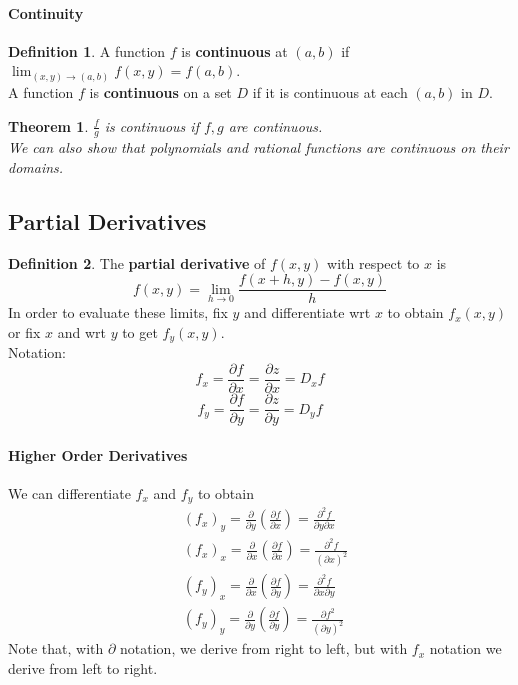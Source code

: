 \documentclass[12 pt]{article}
\newtheorem{thm}{Theorem}
\theoremstyle{definition}
\newtheorem{defn}{Definition}
\begin{document}
\paragraph{Continuity}
\begin{defn}
	A function $f$ is \textbf{continuous} at $(a,b)$ if $\lim_{(x,y)\to(a,b)}f(x,y)=f(a,b)$.
	\\ A function $f$ is \textbf{continuous} on a set $D$ if it is continuous at each $(a,b)$ in $D$.
\end{defn}
\begin{thm}
	$\frac{f}{g}$ is continuous if $f,g$ are continuous.
	\\ We can also show that polynomials and rational functions are continuous on their domains.
\end{thm}
\subsection{Partial Derivatives}
\begin{defn}
	The \textbf{partial derivative} of $f(x,y)$ with respect to $x$ is $$f(x,y)=\lim_{h\to 0}\frac{f(x+h,y)-f(x,y)}{h}$$
	In order to evaluate these limits, fix $y$ and differentiate wrt $x$ to obtain $f_x(x,y)$ or fix $x$ and wrt $y$ to get $f_y(x,y)$.
	\\ Notation: $$f_x=\frac{\partial f}{\partial x}=\frac{\partial z}{\partial x}=D_{x}f$$
	$$f_y=\frac{\partial f}{\partial y}=\frac{\partial z}{\partial y}=D_y f$$
\end{defn}
\paragraph{Higher Order Derivatives}
We can differentiate $f_x$ and $f_y$ to obtain
\begin{align*}
	&(f_x)_y=\frac{\partial}{\partial y}\left(\frac{\partial f}{\partial x}\right)=\frac{\partial^2 f}{\partial y \partial x}
	\\&(f_x)_x=\frac{\partial}{\partial x}\left(\frac{\partial f}{\partial x}\right)=\frac{\partial^2 f}{(\partial x)^2}
	\\&(f_y)_x=\frac{\partial}{\partial x}\left(\frac{\partial f}{\partial y}\right)=\frac{\partial^2 f}{\partial x \partial y}
	\\&(f_y)_y=\frac{\partial}{\partial y}\left(\frac{\partial f}{\partial y}\right)=\frac{\partial f^2}{(\partial y)^2}
\end{align*}
Note that, with $\partial$ notation, we derive from right to left, but with $f_x$ notation we derive from left to right.
\end{document}
